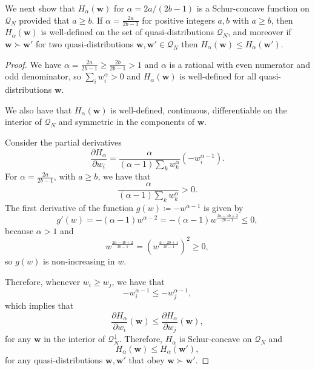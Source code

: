 \documentclass[
twocolumn,
superscriptaddress
]{revtex4-1}
\newenvironment{customthm}[1]
  {\renewcommand\theinnercustomthm{#1}\innercustomthm}
  {\endinnercustomthm}
\def\w{\boldsymbol{w}}
\begin{document}
We next show that $H_\alpha (\w)$ for $\alpha = 2a/(2b-1)$ is a Schur-concave function on $\mathcal{Q}_N$ provided that $a \ge b$.
\begin{customthm}{9}\label{thm:HSchur}
	If $\alpha = \frac{2a}{2b-1}$ for positive integers $a,b$ with $a \geq b$, then $H_\alpha(\w)$ is well-defined on the set of quasi-distributions $\mathcal{Q}_N$, and moreover if $\w \succ \w'$ for two quasi-distributions $\w, \w'\in \mathcal{Q}_N$ then $H_\alpha (\w) \leq H_\alpha(\w')$.
\end{customthm}
\begin{proof}
We have $\alpha = \frac{2a}{2b-1} \geq \frac{2b}{2b-1} > 1$ and $\alpha$ is a rational with even numerator and odd denominator, so $\sum_i w_i^\alpha > 0$ and $H_\alpha(\w)$ is well-defined for all quasi-distributions $\w$.

We also have that $H_\alpha(\w)$ is well-defined, continuous, differentiable on the interior of $\mathcal{Q}_N$ and symmetric in the components of $\w$.

Consider the partial derivatives
\begin{equation}
	\frac{\partial H_\alpha}{\partial w_i} = \frac{\alpha}{(\alpha-1)\sum_k{w_k^\alpha}}\left( -w_i^{\alpha-1} \right).
\end{equation}
For $\alpha= \frac{2a}{2b-1}$,  with $a\ge b$, we have that
\begin{equation}
	\frac{\alpha}{(\alpha-1)\sum_k{w_k^\alpha}} > 0.
\end{equation}
The first derivative of the function $g(w) \coloneqq -w^{\alpha - 1}$ is given by
\begin{equation}
	g'(w) = -(\alpha - 1) w^{\alpha-2} = -(\alpha - 1)w^{\frac{2a-4b+2}{2b-1}} \leq 0,
\end{equation}
because $\alpha > 1$ and
\begin{equation}
	w^{\frac{2a-4b+2}{2b-1}} = \left(w^{\frac{a-2b+1}{2b-1}}\right)^{2} \geq 0,
\end{equation}
so $g(w)$ is non-increasing in $w$.

Therefore, whenever $w_i \geq w_j$, we have that 
\begin{equation}
	-w_i^{\alpha-1} \leq -w_j^{\alpha-1},
\end{equation}
which implies that
\begin{equation}
	\frac{\partial H_\alpha}{\partial w_i}(\w) \leq \frac{\partial H_\alpha}{\partial w_j}(\w),
\end{equation}
for any $\w$ in the interior of $\mathcal{Q}_N^\downarrow$.
Therefore, $H_\alpha$ is Schur-concave on $\mathcal{Q}_N$ and
\begin{equation}
	H_\alpha(\w) \leq H_\alpha(\w'),
\end{equation}
for any quasi-distributions $\w, \w'$ that obey $\w \succ \w'$.
\end{proof}
\end{document}
